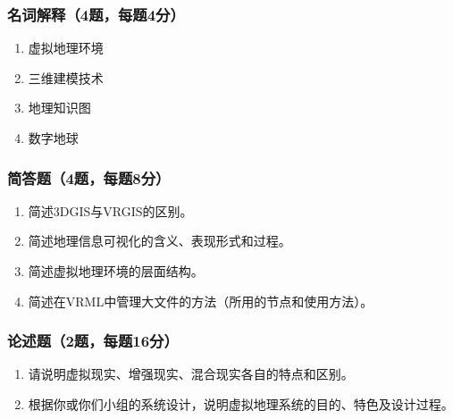\documentclass[
  11pt,
]{ctexart}
\providecommand{\tightlist}{%
  \setlength{\itemsep}{0pt}\setlength{\parskip}{0pt}}
\begin{document}
\subsubsection{名词解释（4题，每题4分）}\label{ux540dux8bcdux89e3ux91ca4ux9898ux6bcfux98984ux5206}

\begin{enumerate}
\def\labelenumi{\arabic{enumi}.}
\tightlist
\item
  虚拟地理环境
\item
  三维建模技术
\item
  地理知识图
\item
  数字地球
\end{enumerate}

\subsubsection{简答题（4题，每题8分）}\label{ux7b80ux7b54ux98984ux9898ux6bcfux98988ux5206}

\begin{enumerate}
\def\labelenumi{\arabic{enumi}.}
\tightlist
\item
  简述3DGIS与VRGIS的区别。
\item
  简述地理信息可视化的含义、表现形式和过程。
\item
  简述虚拟地理环境的层面结构。
\item
  简述在VRML中管理大文件的方法（所用的节点和使用方法）。
\end{enumerate}

\subsubsection{论述题（2题，每题16分）}\label{ux8bbaux8ff0ux98982ux9898ux6bcfux989816ux5206}

\begin{enumerate}
\def\labelenumi{\arabic{enumi}.}
\tightlist
\item
  请说明虚拟现实、增强现实、混合现实各自的特点和区别。
\item
  根据你或你们小组的系统设计，说明虚拟地理系统的目的、特色及设计过程。
\end{enumerate}
\end{document}
